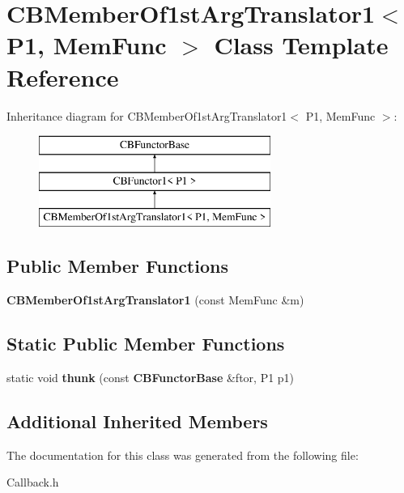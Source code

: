 \section{C\+B\+Member\+Of1st\+Arg\+Translator1$<$ P1, Mem\+Func $>$ Class Template Reference}
\label{classCBMemberOf1stArgTranslator1}
Inheritance diagram for C\+B\+Member\+Of1st\+Arg\+Translator1$<$ P1, Mem\+Func $>$\+:\begin{figure}[H]
\begin{center}
\leavevmode
\includegraphics[height=3.000000cm]{classCBMemberOf1stArgTranslator1}
\end{center}
\end{figure}
\subsection*{Public Member Functions}
\begin{DoxyCompactItemize}
\item 
{\bfseries C\+B\+Member\+Of1st\+Arg\+Translator1} (const Mem\+Func \&m)\label{classCBMemberOf1stArgTranslator1_ab49120b3b5bff2dd8e6d4ffedf37d9be}

\end{DoxyCompactItemize}
\subsection*{Static Public Member Functions}
\begin{DoxyCompactItemize}
\item 
static void {\bfseries thunk} (const {\bf C\+B\+Functor\+Base} \&ftor, P1 p1)\label{classCBMemberOf1stArgTranslator1_a8d0d7551febbaad74a7b5871e13ec5aa}

\end{DoxyCompactItemize}
\subsection*{Additional Inherited Members}


The documentation for this class was generated from the following file\+:\begin{DoxyCompactItemize}
\item 
Callback.\+h\end{DoxyCompactItemize}
